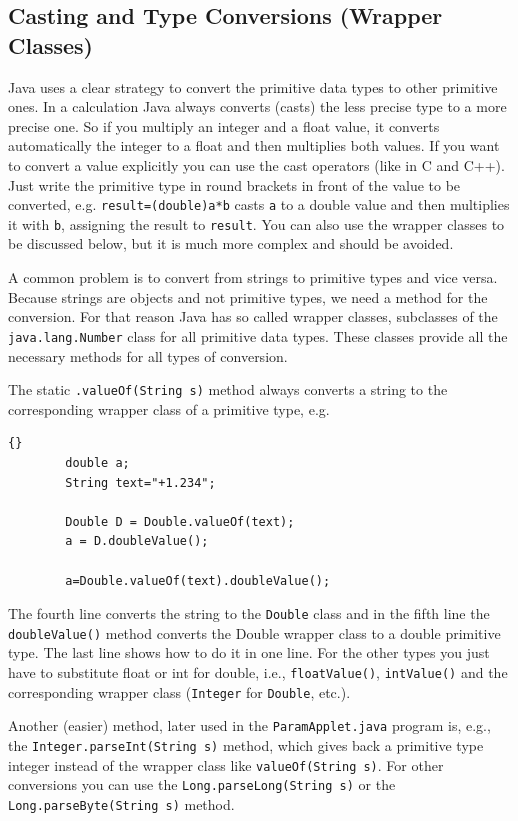 \subsection{Casting and Type Conversions (Wrapper Classes)}

Java uses a clear strategy to convert the primitive data types to 
other primitive ones. In a calculation Java always converts (casts)
the less precise type to a more precise one. So if you multiply an
integer and a float value, it converts automatically the integer to
a float and then multiplies both values. If you want to convert
a value explicitly you can use the cast operators (like in C and C++).
Just write the primitive type in round brackets in front of the value to
be converted, e.g. \verb|result=(double)a*b| casts \verb|a| to 
a double value and
then multiplies it with \verb|b|, assigning the result to \verb|result|.
You can also use the wrapper classes to be discussed below, but
it is much more complex and should be avoided.

A common problem is to convert from strings to primitive types and
vice versa. Because strings are objects and not primitive types, we
need a method for the conversion. For that reason Java has so called
wrapper classes, subclasses of the \verb|java.lang.Number| class 
for all primitive data types. 
These classes provide all the necessary methods for all types of
conversion. 

The static \verb|.valueOf(String s)| method always converts a string
to the corresponding wrapper class of a primitive type, e.g. 
\begin{lstlisting}{}
        double a;
        String text="+1.234";

        Double D = Double.valueOf(text);
        a = D.doubleValue();

        a=Double.valueOf(text).doubleValue();
\end{lstlisting}
The fourth line converts the string to the \verb|Double| class and in the
fifth line 
the \verb|doubleValue()| method converts the Double wrapper class 
to a double primitive type. The last line shows how to do it in
one line.
For the other types you just have to substitute float or int 
for double, i.e., \verb|floatValue()|, \verb|intValue()| and the
corresponding wrapper class (\verb|Integer| for \verb|Double|, etc.).
 
Another (easier) method, 
later used in the \verb|ParamApplet.java| program is, e.g.,
the \verb|Integer.parseInt(String s)| method, which gives back a primitive
type integer instead of the wrapper class like \verb|valueOf(String s)|.
For other conversions you can use the \verb|Long.parseLong(String s)| or the
\verb|Long.parseByte(String s)| method.

